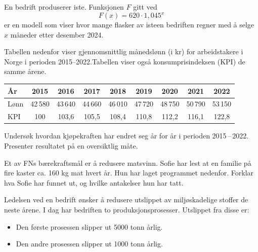 En bedrift produserer iste. Funksjonen $F$ gitt ved
\[
F(x) = 620 \cdot 1,045^x
\]
er en modell som viser hvor mange flasker av isteen bedriften regner med å
selge $x$ måneder etter desember 2024.



Tabellen nedenfor viser gjennomsnittlig månedslønn (i kr) for arbeidstakere i Norge i
perioden 2015--2022.Tabellen viser også konsumprisindeksen (KPI) de samme
årene.
\begin{center}
	\small
	\begin{tabular}{|l|c|c|c|c|c|c|c|c|}
		\hline
		År & 2015 & 2016 & 2017 & 2018 & 2019 & 2020 & 2021 & 2022 \\
		\hline
		Lønn & 42\,580 & 43\,640 & 44\,660 & 46\,010 & 47\,720 & 48\,750 & 50\,790 & 53\,150 \\
		\hline
		KPI & 100 & 103,6 & 105,5 & 108,4 & 110,8 & 112,2 & 116,1 & 122,8 \\
		\hline
	\end{tabular}
\end{center}
Undersøk hvordan kjøpekraften har endret seg år for år i perioden 2015\,--\,2022.
Presenter resultatet på en oversiktlig måte.

Et av FNs bærekraftsmål er å redusere matsvinn.
Sofie har lest at en familie på fire kaster ca. 160 kg mat hvert år. Hun har laget
programmet nedenfor.
Forklar hva Sofie har funnet ut, og hvilke antakelser hun har tatt.

Ledelsen ved en bedrift ønsker å redusere utslippet av miljøskadelige
stoffer de neste årene. I dag har bedriften to produksjonsprosesser. Utslippet fra disse er:
\begin{itemize}
	\item Den første prosessen slipper ut 5000 tonn årlig.
	\item Den andre prosessen slipper ut 1000 tonn årlig.
\end{itemize}

